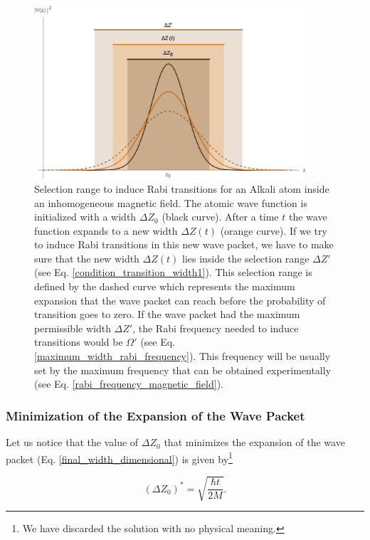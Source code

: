 \documentclass{article}
\begin{document}
\begin{figure}
    \centering
    \includegraphics[width=0.9\textwidth]{working_area.png}
     \caption{Selection range to induce Rabi transitions for an Alkali atom inside an inhomogeneous magnetic field. The atomic wave function is initialized with a width $\Delta Z_{0}$ (black curve). After a time $t$ the wave function expands to a new width $\Delta Z(t)$ (orange curve). If we try to induce Rabi transitions in this new wave packet, we have to make sure that the new width $\Delta Z(t)$ lies inside the selection range $\Delta Z'$ (see Eq. \ref{condition_transition_width1}). This selection range is defined by the dashed curve which represents the maximum expansion that the wave packet can reach before the probability of transition goes to zero. If the wave packet had the maximum permissible width $\Delta Z'$, the Rabi frequency needed to induce transitions would be $\Omega'$ (see Eq. \ref{maximum_width_rabi_frequency}). This frequency will be usually set by the maximum frequency that can be obtained experimentally (see Eq. \ref{rabi_frequency_magnetic_field}).}
     \label{selection_range_figure}
\end{figure}

\subsubsection{Minimization of the Expansion of the Wave Packet}
Let us notice that the value of $\Delta Z_{0}$ that minimizes the expansion of the wave packet (Eq. \ref{final_width_dimensional}) is given by\footnote{We have discarded the solution with no physical meaning.}

\begin{equation}\label{initial_width_minimizes_final_width}
    (\Delta Z_{0})^{\ast} = \sqrt{\frac{\hbar t }{2M}}.
\end{equation}
\end{document}
